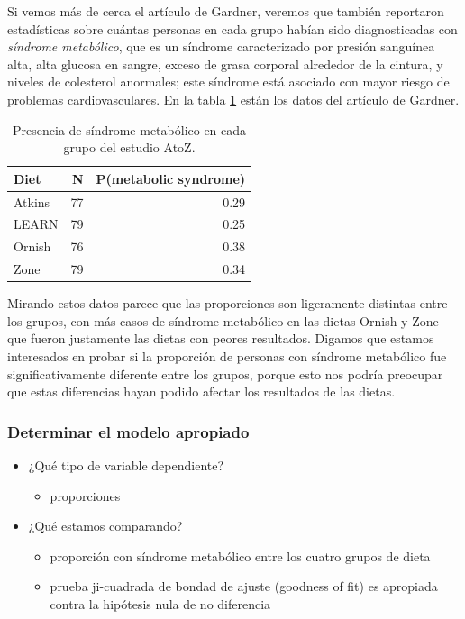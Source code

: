 \documentclass[
  12pt,
]{book}
\providecommand{\tightlist}{%
  \setlength{\itemsep}{0pt}\setlength{\parskip}{0pt}}
\begin{document}
Si vemos más de cerca el artículo de Gardner, veremos que también reportaron estadísticas sobre cuántas personas en cada grupo habían sido diagnosticadas con \emph{síndrome metabólico}, que es un síndrome caracterizado por presión sanguínea alta, alta glucosa en sangre, exceso de grasa corporal alrededor de la cintura, y niveles de colesterol anormales; este síndrome está asociado con mayor riesgo de problemas cardiovasculares. En la tabla \ref{tab:metabolicSyndrome} están los datos del artículo de Gardner.

\begin{table}

\caption{\label{tab:metabolicSyndrome}Presencia de síndrome metabólico en cada grupo del estudio AtoZ.}
\centering
\begin{tabular}[t]{l|r|r}
\hline
Diet & N & P(metabolic syndrome)\\
\hline
Atkins & 77 & 0.29\\
\hline
LEARN & 79 & 0.25\\
\hline
Ornish & 76 & 0.38\\
\hline
Zone & 79 & 0.34\\
\hline
\end{tabular}
\end{table}

Mirando estos datos parece que las proporciones son ligeramente distintas entre los grupos, con más casos de síndrome metabólico en las dietas Ornish y Zone -- que fueron justamente las dietas con peores resultados. Digamos que estamos interesados en probar si la proporción de personas con síndrome metabólico fue significativamente diferente entre los grupos, porque esto nos podría preocupar que estas diferencias hayan podido afectar los resultados de las dietas.

\hypertarget{determinar-el-modelo-apropiado}{%
\subsubsection{Determinar el modelo apropiado}\label{determinar-el-modelo-apropiado}}

\begin{itemize}
\tightlist
\item
  ¿Qué tipo de variable dependiente?

  \begin{itemize}
  \tightlist
  \item
    proporciones
  \end{itemize}
\item
  ¿Qué estamos comparando?

  \begin{itemize}
  \tightlist
  \item
    proporción con síndrome metabólico entre los cuatro grupos de dieta
  \item
    prueba ji-cuadrada de bondad de ajuste (goodness of fit) es apropiada contra la hipótesis nula de no diferencia
  \end{itemize}
\end{itemize}
\end{document}
